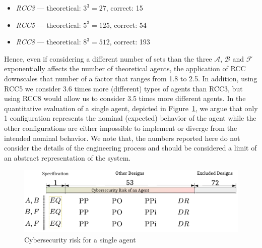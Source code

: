 \documentclass[conference]{IEEEtran}
\newcommand{\assertionRegion}{\mathcal{A}}
\newcommand{\beliefRegion}{\mathcal{B}}
\newcommand{\factRegion}{\mathcal{F}}
\begin{document}
\begin{itemize}%
\item \emph{RCC3} --- theoretical: $3^3=27$,  correct: 15 
\item \emph{RCC5} --- theoretical: $5^3=125$, correct: 54
\item \emph{RCC8} --- theoretical: $8^3=512$, correct: 193
\end{itemize}

Hence, even if considering a different number of sets than the three
$\assertionRegion$, $\beliefRegion$ and $\factRegion$ exponentially affects
the number of theoretical agents, the application of RCC downscales that number
of a factor that ranges from 1.8 to 2.5. In addition, using RCC5 we consider
3.6 times more (different) types of agents than RCC3, but using RCC8 would
allow us to consider 3.5 times more different agents.
In the quantitative evaluation of a single agent, depicted in Figure~\ref{fig:quantitative},
we argue that only 1 configuration represents the nominal (expected) behavior 
of the agent while the other configurations are either impossible to 
implement or diverge from the intended nominal behavior. We note 
that, the numbers reported here do not consider the details of the
engineering process and should be considered a limit of an abstract 
representation of the system.
\begin{figure}[t]
	\centering
	\includegraphics[width=\columnwidth]{quantitative.pdf}
	\caption{Cybersecurity risk for a single agent}
	\label{fig:quantitative}
\end{figure}
\end{document}
